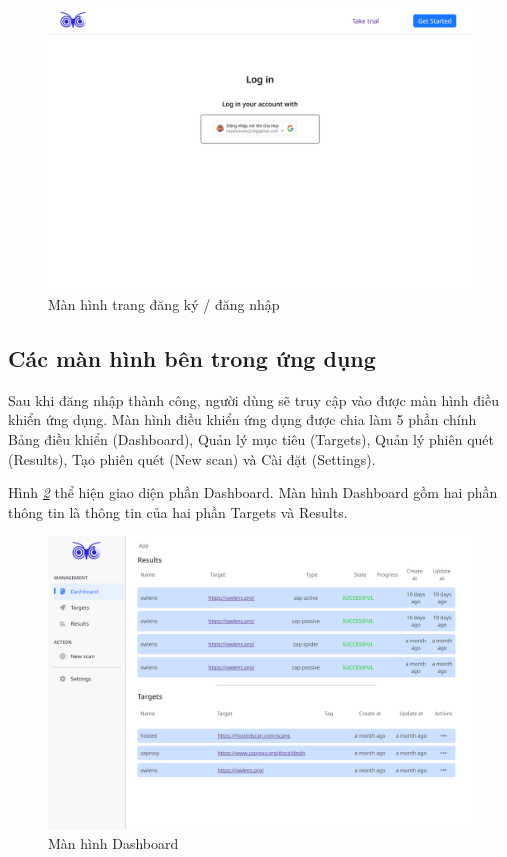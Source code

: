 \begin{figure}[H]
      \centering
      \includegraphics[width=\textwidth]{applied-thesis-chapters/chapter-6/Màn hình trang đăng nhập đăng ký.png}
      \caption{Màn hình trang đăng ký / đăng nhập}
      \label{fig:ManHinhTrangDangKyDangNhap}
\end{figure}

\subsection{Các màn hình bên trong ứng dụng}

\tab Sau khi đăng nhập thành công, người dùng sẽ truy cập vào được màn hình điều khiển ứng dụng.
Màn hình điều khiển ứng dụng được chia làm 5 phần chính Bảng điều khiển (Dashboard), Quản lý mục tiêu (Targets), Quản lý phiên quét (Results), Tạo phiên quét (New scan) và Cài đặt (Settings).

\tab \tab Hình \textit{\ref{fig:ManHinhDashboard} } thể hiện giao diện phần Dashboard.
Màn hình Dashboard gồm hai phần thông tin là thông tin của hai phần Targets và Results.

\begin{figure}[H]
      \centering
      \includegraphics[width=\textwidth]{applied-thesis-chapters/chapter-6/Màn hình Dashboard.png}
      \caption{Màn hình Dashboard}
      \label{fig:ManHinhDashboard}
\end{figure}

